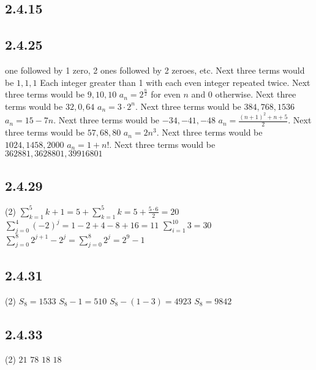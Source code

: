 \documentclass[12pt,titlepage]{extarticle}
\begin{document}
\subsection*{2.4.15} %

\subsection*{2.4.25}
\begin{tasks}
     one followed by 1 zero, 2 ones followed by 2 zeroes, etc. Next three terms would be $1,1,1$
    \task Each integer greater than 1 with each even integer repeated twice. Next three terms would be $9, 10, 10$
    \task $a_n = 2^{\frac{n}{2}}$ for even $n$ and $0$ otherwise. Next three terms would be $32, 0, 64$
    \task $a_n = 3 \cdot 2^n$. Next three terms would be $384, 768, 1536$
    \task $a_n = 15 - 7n$. Next three terms would be $-34, -41, -48$
    \task $a_n = \frac{(n+1)^2 + n + 5}{2}$. Next three terms would be $57, 68, 80$
    \task $a_n = 2n^3$. Next three terms would be $1024, 1458, 2000$
    \task $a_n = 1 + n!$. Next three terms would be $362881, 3628801, 39916801$
\end{tasks}

\subsection*{2.4.29}
\begin{tasks}(2)
    \task $\displaystyle \sum_{k=1}^5 k + 1 = 5 + \sum_{k = 1}^5 k = 5 + \frac{5\cdot 6}{2} = 20$
    \task $\displaystyle \sum_{j=0}^4 (-2)^j = 1 - 2 + 4 - 8 + 16 = 11$
    \task $\displaystyle \sum_{i=1}^{10} 3 = 30$
    \task $\displaystyle \sum_{j=0}^8 2^{j+1} - 2^j = \sum_{j=0}^8 2^j = 2^9 - 1$
\end{tasks}

\subsection*{2.4.31}
\begin{tasks}(2)
    \task $S_8 = 1533$
    \task $S_8 - 1 = 510$
    \task $S_8 - (1 - 3) = 4923$
    \task $S_8 = 9842$
\end{tasks}

\subsection*{2.4.33}
\begin{tasks}(2)
    \task $21$
    \task $78$
    \task $18$
    \task $18$
\end{tasks}
\end{document}
